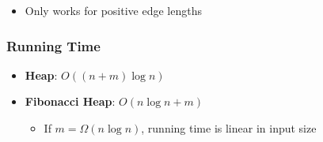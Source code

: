     \begin{itemize}
      \item Only works for positive edge lengths
    \end{itemize}

    \subsubsection{Running Time}

      \begin{itemize}
        \item \textbf{Heap}: $ O\left( \left( n + m\right) \log n \right) $
        \item \textbf{Fibonacci Heap}: $ O\left( n \log n + m \right) $
        \begin{itemize}
          \item If $ m = \Omega \left( n \log n \right) $, running time is
          linear in input size
        \end{itemize}
      \end{itemize}
